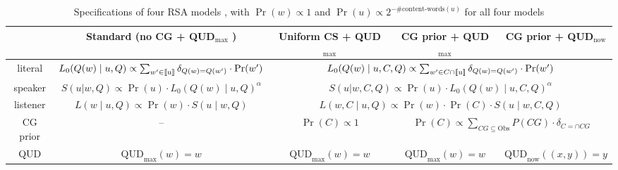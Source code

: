 \begin{table}
\centering
\begin{tabular}{c|c|c|c|c}
         & Standard (no CG + QUD$_\text{max}$ ) & Uniform CS + QUD$_\text{max}$ & CG prior + QUD$_\text{max}$ & CG prior + QUD$_\text{now}$ \\ \hline 
literal  & $L_0(Q(w) \mid u, Q) \propto  \sum_{w'\in \llbracket \text{u} \rrbracket} \delta_{Q(w)=Q(w')} \cdot \Pr(w') $ & 
\multicolumn{3}{c}{$L_0(Q(w) \mid u, C, Q) \propto  \sum_{w'\in C\cap \llbracket \text{u} \rrbracket} \delta_{Q(w)=Q(w')} \cdot \Pr(w')$} \\
speaker  & $S(u | w, Q) \propto \Pr(u) \cdot L_0(Q(w) \mid u, Q)^\alpha $ & \multicolumn{3}{c}{$S(u | w, C, Q) \propto \Pr(u) \cdot L_0(Q(w) \mid u, C, Q)^\alpha$} \\
listener & $L(w \mid u, Q) \propto \Pr(w) \cdot S(u \mid w, Q)$ & \multicolumn{3}{c}{$L(w, C \mid u, Q) \propto \Pr(w) \cdot \Pr(C) \cdot S(u \mid w, C, Q)$} \\
CG prior & -- & $\Pr(C) \propto 1$ & \multicolumn{2}{c}{$\Pr(C) \propto \sum_{CG\subseteq\text{Obs}} P(CG) \cdot \delta_{C=\cap CG}$}\\
QUD      & $\text{QUD}_\text{max}(w)=w$ & $\text{QUD}_\text{max}(w)=w$ & $\text{QUD}_\text{max}(w)=w$ & $\text{QUD}_\text{now}((x,y))=y$\\
\hline
\end{tabular}
\caption{Specifications of four RSA models \label{tab:models}, with $\Pr(w)\propto1$ and $\Pr(u) \propto 2^{-\#\textrm{content-words}(u)}$ for all four models}
\vspace{-2ex}
\end{table} 
 
